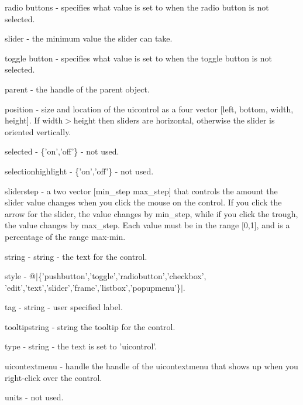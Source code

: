 \begin{DoxyItemize}
\begin{DoxyItemize}
\item {\ttfamily radio buttons} -\/ specifies what {\ttfamily value} is set to when the radio button is not selected.  
\item {\ttfamily slider} -\/ the minimum value the slider can take.  
\item {\ttfamily toggle button} -\/ specifies what {\ttfamily value} is set to when the toggle button is not selected.  
\end{DoxyItemize}
\item {\ttfamily parent} -\/ the handle of the parent object.  
\item {\ttfamily position} -\/ size and location of the uicontrol as a four vector {\ttfamily \mbox{[}left, bottom, width, height\mbox{]}}. If {\ttfamily width$>$height} then sliders are horizontal, otherwise the slider is oriented vertically.  
\item {\ttfamily selected} -\/ {\ttfamily \{'on','off'\}} -\/ not used.  
\item {\ttfamily selectionhighlight} -\/ {\ttfamily \{'on','off'\}} -\/ not used.  
\item {\ttfamily sliderstep} -\/ a two vector {\ttfamily \mbox{[}min\-\_\-step max\-\_\-step\mbox{]}} that controls the amount the slider {\ttfamily value} changes when you click the mouse on the control. If you click the arrow for the slider, the value changes by {\ttfamily min\-\_\-step}, while if you click the trough, the value changes by {\ttfamily max\-\_\-step}. Each value must be in the range {\ttfamily \mbox{[}0,1\mbox{]}}, and is a percentage of the range {\ttfamily max-\/min}.  
\item {\ttfamily string} -\/ {\ttfamily string} -\/ the text for the control.  
\item {\ttfamily style} -\/ @$|$\{'pushbutton','toggle','radiobutton','checkbox', 'edit','text','slider','frame','listbox','popupmenu'\}$|$.  
\item {\ttfamily tag} -\/ {\ttfamily string} -\/ user specified label.  
\item {\ttfamily tooltipstring} -\/ {\ttfamily string} the tooltip for the control.  
\item {\ttfamily type} -\/ {\ttfamily string} -\/ the text is set to {\ttfamily 'uicontrol'}.  
\item {\ttfamily uicontextmenu} -\/ {\ttfamily handle} the handle of the {\ttfamily uicontextmenu} that shows up when you right-\/click over the control.  
\item {\ttfamily units} -\/ not used.  

\end{DoxyItemize}
